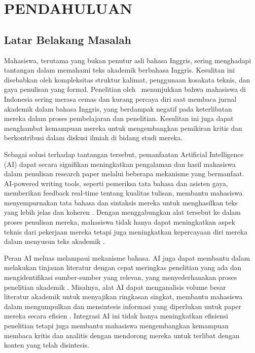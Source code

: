\chapter{PENDAHULUAN}

\setcounter{page}{1}
\thispagestyle{plain}
\pagestyle{arabicstyle}

\section{Latar Belakang Masalah}

Mahasiswa, terutama yang bukan penutur asli bahasa Inggris, sering menghadapi tantangan dalam memahami teks akademik berbahasa Inggris. Kesulitan ini disebabkan oleh kompleksitas struktur kalimat, penggunaan kosakata teknis, dan gaya penulisan yang formal. Penelitian oleh~\cite{Dardjito} menunjukkan bahwa mahasiswa di Indonesia sering merasa cemas dan kurang percaya diri saat membaca jurnal akademik dalam bahasa Inggris, yang berdampak negatif pada keterlibatan mereka dalam proses pembelajaran dan penelitian. Kesulitan ini juga dapat menghambat kemampuan mereka untuk mengembangkan pemikiran kritis dan berkontribusi dalam diskusi ilmiah di bidang studi mereka.

Sebagai solusi terhadap tantangan tersebut, pemanfaatan Artificial Intelligence (AI) dapat secara signifikan meningkatkan pengalaman dan hasil mahasiswa dalam penulisan research paper melalui beberapa mekanisme yang bermanfaat. AI-powered writing tools, seperti pemeriksa tata bahasa dan asisten gaya, memberikan feedback real-time tentang kualitas tulisan, membantu mahasiswa menyempurnakan tata bahasa dan sintaksis mereka untuk menghasilkan teks yang lebih jelas dan koheren \citep{kong2024pedagogical,nazari2021application}. Dengan menggabungkan alat tersebut ke dalam proses penulisan mereka, mahasiswa tidak hanya dapat meningkatkan aspek teknis dari pekerjaan mereka tetapi juga meningkatkan kepercayaan diri mereka dalam menyusun teks akademik \citep{nazari2021application}.

Peran AI meluas melampaui mekanisme bahasa. AI juga dapat membantu dalam melakukan tinjauan literatur dengan cepat meringkas penelitian yang ada dan mengidentifikasi sumber-sumber yang relevan, yang menyederhanakan proses penelitian akademik \citep{gupta2024artificial}. Misalnya, alat AI dapat menganalisis volume besar literatur akademik untuk menyajikan ringkasan singkat, membantu mahasiswa dalam mengumpulkan dan mensintesis informasi yang diperlukan untuk paper mereka secara efisien \citep{bulante2024ai}. Integrasi AI ini tidak hanya meningkatkan efisiensi penelitian tetapi juga membantu mahasiswa mengembangkan kemampuan membaca kritis dan analitis dengan mendorong mereka untuk terlibat dengan konten yang telah disintesis.

